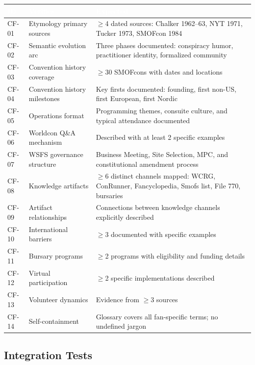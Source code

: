 \documentclass[11pt,letterpaper]{article}
\newcommand{\tableheader}[1]{\textbf{\sffamily\textcolor{white}{#1}}}
\begin{document}
\begin{center}
\begin{tabularx}{\textwidth}{C{1.2cm}L{3cm}X}
\toprule
{}
\tableheader{ID} & \tableheader{Verifies} & \tableheader{Expected} \\
\midrule
CF-01 & Etymology primary sources & $\geq$4 dated sources: Chalker 1962--63, NYT 1971, Tucker 1973, SMOFcon 1984 \\
CF-02 & Semantic evolution arc & Three phases documented: conspiracy humor, practitioner identity, formalized community \\
CF-03 & Convention history coverage & $\geq$30 SMOFcons with dates and locations \\
CF-04 & Convention history milestones & Key firsts documented: founding, first non-US, first European, first Nordic \\
CF-05 & Operations format & Programming themes, consuite culture, and typical attendance documented \\
CF-06 & Worldcon Q\&A mechanism & Described with at least 2 specific examples \\
CF-07 & WSFS governance structure & Business Meeting, Site Selection, MPC, and constitutional amendment process \\
CF-08 & Knowledge artifacts & $\geq$6 distinct channels mapped: WCRG, ConRunner, Fancyclopedia, Smofs list, File 770, bursaries \\
CF-09 & Artifact relationships & Connections between knowledge channels explicitly described \\
CF-10 & International barriers & $\geq$3 documented with specific examples \\
CF-11 & Bursary programs & $\geq$2 programs with eligibility and funding details \\
CF-12 & Virtual participation & $\geq$2 specific implementations described \\
CF-13 & Volunteer dynamics & Evidence from $\geq$3 sources \\
CF-14 & Self-containment & Glossary covers all fan-specific terms; no undefined jargon \\
\bottomrule
\end{tabularx}
\end{center}

\subsection{Integration Tests}
\end{document}
